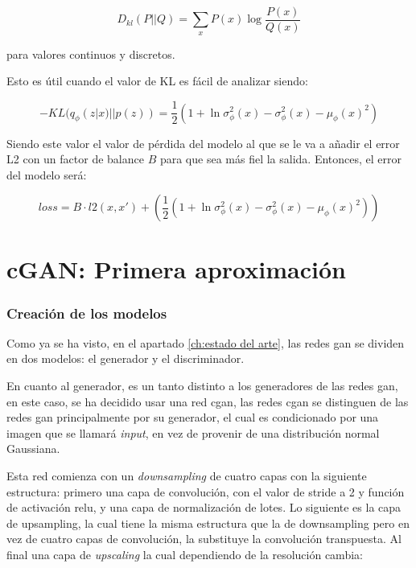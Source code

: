 \begin{equation}
	D_{kl}(P||Q)=\sum_xP(x)\log \frac {P(x)} {Q(x)}
\end{equation}

para valores continuos y discretos.

Esto es útil cuando el valor de KL es fácil de analizar siendo: 

\begin{equation}
	-KL(q_\phi(z|x)||p(z))= \frac {1}{2}(1 + \ln\sigma_\phi^2(x) - \sigma_\phi^2(x) - \mu_\phi(x)^2)
\end{equation}

Siendo este valor el valor de pérdida del modelo al que se le va a añadir el error L2 con un factor de balance \(B\) para que sea más fiel la salida. Entonces, el error del modelo será: 

\begin{equation}
	loss = B \cdot l2(x, x') + \left(\frac {1}{2}(1 + \ln\sigma_\phi^2(x) - \sigma_\phi^2(x) - \mu_\phi(x)^2)\right)
\end{equation}


\section{cGAN: Primera aproximación}

\subsubsection{Creación de los modelos}

Como ya se ha visto, en el apartado \ref{ch:estado del arte},  las redes \gls{gan} se dividen en dos modelos: el generador y el discriminador.

En cuanto al generador, es un tanto distinto a los generadores de las redes \gls{gan}, en este caso, se ha decidido usar una red \acrfull{cgan}, las redes \gls{cgan} se distinguen de las redes \gls{gan} principalmente por su generador, el cual es condicionado por una imagen que se llamará \textit{input}, en vez de provenir de una distribución normal Gaussiana.

Esta red comienza con un \textit{downsampling} de cuatro capas con la siguiente estructura: primero una capa de convolución, con el valor de stride a 2 y función de activación relu, y una capa de normalización de lotes. Lo siguiente es la capa de upsampling, la cual tiene la misma estructura que la de downsampling pero en vez de cuatro capas de convolución, la substituye la convolución transpuesta. Al final una capa de \textit{upscaling} la cual dependiendo de la resolución cambia:

